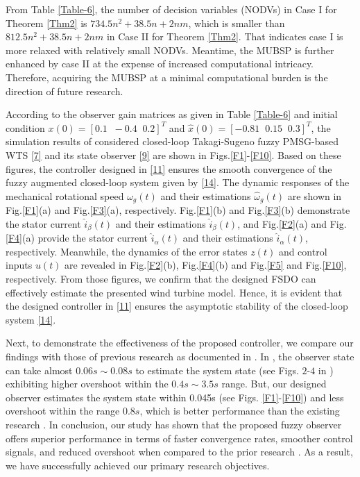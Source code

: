 \documentclass[preprint,11pt]{elsarticle}
\begin{document}
{From Table \ref{Table-6}, the number of decision variables (NODVs) in Case I for Theorem \ref{Thm2} is $734.5n^2+38.5n+2nm$, which is smaller than $812.5n^2+38.5n+2nm$ in Case II for Theorem \ref{Thm2}. That indicates case I is more relaxed with relatively small NODVs. Meantime, the MUBSP is further enhanced by case II at the expense of increased computational intricacy. Therefore, acquiring the MUBSP at a minimal computational burden is the direction of future research.}



According to the observer gain matrices as given in Table \ref{Table-6} and initial condition $x(0)=[ 0.1\;\;-0.4\;\;0.2 ]^T$ and $\hat{x}(0)=[-0.81\;\;0.15\;\;0.3 ]^T$, the simulation results of considered closed-loop {Takagi-Sugeno} fuzzy PMSG-based WTS \eqref{7} and its state observer \eqref{9} are shown in Figs.\ref{F1}-\ref{F10}. Based on these figures, the controller designed in \eqref{11} ensures the smooth convergence of the fuzzy augmented closed-loop system given by \eqref{14}. The dynamic responses of the mechanical rotational speed $\omega_g(t)$ and their estimations $\hat{\omega}_g(t)$ are shown in Fig.\ref{F1}(a) and Fig.\ref{F3}(a), respectively. Fig.\ref{F1}(b) and Fig.\ref{F3}(b) demonstrate the stator current $\hat{i}_\beta(t)$ and their estimations $\hat{i}_\beta(t)$, and  Fig.\ref{F2}(a) and Fig.\ref{F4}(a) provide the stator current $\hat{i}_\alpha(t)$ and their estimations $\hat{i}_\alpha(t)$, respectively. Meanwhile, the dynamics of the error states $z(t)$ and control inputs $u(t)$ are revealed in Fig.\ref{F2}(b), Fig.\ref{F4}(b) and Fig.\ref{F5} and Fig.\ref{F10}, respectively. From those figures, we confirm that the designed FSDO can effectively estimate the presented wind turbine model. Hence, it is evident that the designed controller in \eqref{11} ensures the asymptotic stability of the closed-loop system \eqref{14}.

{Next, to demonstrate the effectiveness of the proposed controller, we compare our findings with those of previous research as documented in \cite{sub1}. In \cite{sub1}, the observer state can take almost $0.06s \sim0.08s$ to estimate the system state (see Figs. ${2}$-${4}$ in \cite{sub1}) exhibiting higher overshoot within the $0.4s \sim3.5s$ range. But, our designed observer estimates the system state within 0.045s (see Figs. \ref{F1}-\ref{F10}) and less overshoot within the range $0.8s$, which is better performance than the existing research \cite{sub1}. In conclusion, our study has shown that the proposed fuzzy observer offers superior performance in terms of faster convergence rates, smoother control signals, and reduced overshoot when compared to the prior research \cite{sub1}.} As a result, we have successfully achieved our primary research objectives.
\end{document}
